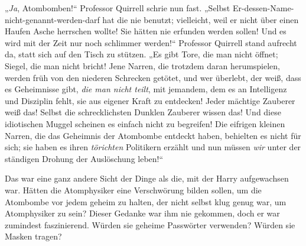 „\emph{Ja}, Atombomben!“ Professor Quirrell schrie nun fast.
„Selbst Er-dessen-Name-nicht-genannt-werden-darf hat die nie benutzt; vielleicht, weil er nicht über einen Haufen Asche herrschen wollte! Sie hätten nie erfunden werden sollen! Und es wird mit der Zeit nur noch schlimmer werden!“ Professor Quirrell stand aufrecht da, statt sich auf den Tisch zu stützen.
„Es gibt Tore, die man nicht öffnet; Siegel, die man nicht bricht! Jene Narren, die trotzdem daran herumspielen, werden früh von den niederen Schrecken getötet, und wer überlebt, der weiß, dass es Geheimnisse gibt, \emph{die man nicht teilt}, mit jemandem, dem es an Intelligenz und Disziplin fehlt, sie aus eigener Kraft zu entdecken! Jeder mächtige Zauberer weiß das! Selbst die schrecklichsten Dunklen Zauberer wissen das! Und diese idiotischen Muggel scheinen es einfach nicht zu begreifen! Die eifrigen kleinen Narren, die das Geheimnis der Atombombe entdeckt haben, behielten es nicht für sich; sie haben es ihren \emph{törichten} Politikern erzählt und nun müssen \emph{wir} unter der ständigen Drohung der Auslöschung leben!“

Das war eine ganz andere Sicht der Dinge als die, mit der Harry aufgewachsen war. Hätten die Atomphysiker eine Verschwörung bilden sollen, um die Atombombe vor jedem geheim zu halten, der nicht selbst klug genug war, um Atomphysiker zu sein? Dieser Gedanke war ihm nie gekommen, doch er war zumindest faszinierend. Würden sie geheime Passwörter verwenden? Würden sie Masken tragen?

